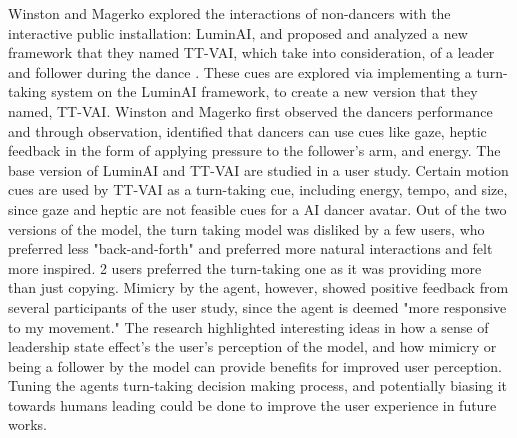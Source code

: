 \documentclass[final,5p,times,twocolumn,authoryear]{article}
\begin{document}
Winston and Magerko explored the interactions of non-dancers with the
interactive public installation: LuminAI, and proposed and analyzed a
new framework that they named TT-VAI, which take into consideration, of
a leader and follower during the dance \cite{Winston2017}. 
These cues are explored via implementing a
turn-taking system on the LuminAI framework, to create a new version
that they named, TT-VAI. Winston and Magerko first observed the dancers
performance and through observation, identified that dancers can use
cues like gaze, heptic feedback in the form of applying pressure to the
follower's arm, and energy. The base version of LuminAI and TT-VAI are
studied in a user study. Certain motion cues are used by TT-VAI as a
turn-taking cue, including energy, tempo, and size, since gaze and
heptic are not feasible cues for a AI dancer avatar. Out of the two versions of the
model, the turn taking model was disliked by a few users, who preferred
less "back-and-forth" and preferred more natural interactions and felt
more inspired. 2 users preferred the turn-taking one as it was providing
more than just copying. Mimicry by the agent, however, showed positive
feedback from several participants of the user study, since the agent is
deemed "more responsive to my movement." The research highlighted
interesting ideas in how a sense of leadership state effect's the user's
perception of the model, and how mimicry or being a follower by the
model can provide benefits for improved user perception. Tuning the
agents turn-taking decision making process, and potentially biasing it
towards humans leading could be done to improve the user experience in
future works.
\end{document}
